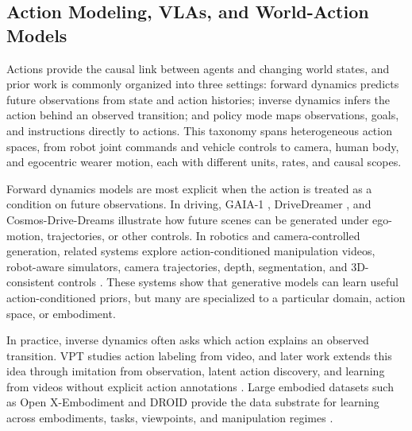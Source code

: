 \documentclass{llmxive}
\begin{document}
\subsection{Action Modeling, VLAs, and World-Action Models}
Actions provide the causal link between agents and changing world states, and prior work is commonly organized into three settings: forward dynamics predicts future observations from state and action histories; inverse dynamics infers the action behind an observed transition; and policy mode maps observations, goals, and instructions directly to actions.
This taxonomy spans heterogeneous action spaces, from robot joint commands and vehicle controls to camera, human body, and egocentric wearer motion, each with different units, rates, and causal scopes.

Forward dynamics models are most explicit when the action is treated as a condition on future observations.
In driving, GAIA-1 \citep{gaia1}, DriveDreamer \citep{wang2023drivedreamer,zhao2025drivedreamer}, and Cosmos-Drive-Dreams \citep{ren2025cosmos} illustrate how future scenes can be generated under ego-motion, trajectories, or other controls.
In robotics and camera-controlled generation, related systems explore action-conditioned manipulation videos, robot-aware simulators, camera trajectories, depth, segmentation, and 3D-consistent controls \citep{liang2024dreamitate,jang2025dreamgen,robodreamer,zhu2024irasim,hma,gao2026dreamdojo,he2024cameractrl,wang2024motionctrl,xu2024camco,ren2025gen3c}.
These systems show that generative models can learn useful action-conditioned priors, but many are specialized to a particular domain, action space, or embodiment.

In practice, inverse dynamics often asks which action explains an observed transition.
VPT \citep{baker2022vpt} studies action labeling from video, and later work extends this idea through imitation from observation, latent action discovery, and learning from videos without explicit action annotations \citep{zhang2022learningdrive,torabi2018bco,yang2019iddm,pavse2019ridm,schmidt2023lapo,ye2024latentaction,latent_action_wild}.
Large embodied datasets such as Open X-Embodiment \citep{vuong2023open} and DROID \citep{khazatsky2024droid} provide the data substrate for learning across embodiments, tasks, viewpoints, and manipulation regimes \citep{walke2023bridgedata,liu2023libero,nasiriany2024robocasa,contributors2024agibotworldrepo,bu2025agibot,grauman2024egoexo4d,li2023behavior1k}.
\end{document}
